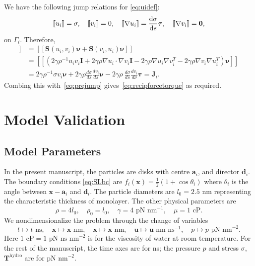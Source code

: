 \documentclass[lineno]{jfm}
\renewcommand{\aa}{\mathbf{a}}
\newcommand{\dd}{\mathbf{d}}
\newcommand{\JJ}{\mathbf{J}}
\newcommand{\nnu}{\boldsymbol{\nu}}
\newcommand{\ttau}{\boldsymbol{\tau}}
\newcommand{\xx}{\mathbf{x}}
\newcommand{\uu}{\mathbf{u}}
\newcommand{\jump}[1]{[\![ #1 ]\!]}
\begin{document}
We have the following jump relations for \eqref{eq:uidef}: 
\begin{equation}
\label{eq:DLjump}
\jump{u_i} = \sigma, \quad
\jump{v_i} = 0, \quad
\jump{\nabla u_i} = \frac{\dif \sigma}{\dif s}\ttau,\quad
\jump{\nabla v_i} = \mathbf{0},
\end{equation}
on $\Gamma_i$. Therefore,
\begin{align*}
  \jump{{\bf T}_2\nnu}   &= \jump{\mathbf{S}(u_i,v_i)\nnu  +\mathbf{S}(v_i,u_i)\nnu} \\
  &= \jump{( 2\gamma\rho^{-1} u_i v_i \mathbf{I} + 2\gamma\rho \nabla u_i \cdot \nabla v_i \mathbf{I} 
- 2\gamma\rho \nabla u_i  \nabla v_i^T - 2\gamma\rho \nabla v_i \nabla u_i^T)  \nnu}\\
&= 2\gamma\rho^{-1} \sigma v_i \nnu + 2\gamma\rho \frac{d\sigma }{ds}\frac{dv_i }{ds} \nnu
- 2\gamma\rho \ \frac{d\sigma }{ds} \frac{dv_i }{d\nu} \ttau = \JJ_i.
\end{align*}
Combing this with~\eqref{eq:prejump} gives~\eqref{eq:recipforcetorque}
as required. 



\section{\label{validation}Model Validation}


\subsection{Model Parameters}
In the present manuscript, the particles are disks with centre $\aa_i$, and director $\dd_i$.  
The boundary conditions \eqref{eq:SLbc} are $f_i(\xx) = \tfrac{1}{2}(1 + \cos \theta_i)$ where $\theta_i$ is the angle between 
$\xx - \aa_i$ and $\dd_i$.  The particle diameters are $l_0 = 2.5$ nm representing the characteristic thickness of monolayer. 
The other physical parameters are 
\begin{equation}
\label{eq:parameters}
\rho = 4 l_0,\quad \rho_0 = l_0,\quad \gamma = \text{4 pN nm}^{-1},\quad \mu = \text{1 cP}.
\end{equation}
We nondimensionalize the problem through the change of variables 
\begin{equation}
\label{eq:nondimensionalize}
t \mapsto t \text{ ns}, \quad
\xx \mapsto \xx \text{ nm}, \quad 
\xx \mapsto \xx \text{ nm}, \quad 
\uu \mapsto \uu \text{ nm ns}^{-1}, \quad 
  p \mapsto p \text{ pN nm}^{-2}.
\end{equation}
Here $\text{1 cP} = \text{1 pN ns nm}^{-2}$ is for the viscosity of water at room temperature.  
For the rest of the manuscript, the time axes are for ns; the pressure $p$ and stress $\sigma$, $\mathbf{T}^{\mathrm{hydro}}$
are for pN nm$^{-2}$.
\end{document}
